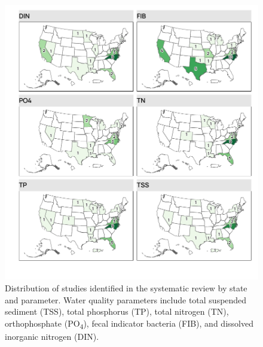 \documentclass[utf8]{FrontiersinHarvard}
\begin{document}
\begin{figure}[p]
\includegraphics[width=1\linewidth,]{frontiers_submission_revision_01_files/figure-latex/fig4} \caption{Distribution of studies identified in the systematic review by state and parameter. Water quality parameters include total suspended sediment (TSS), total phosphorus (TP), total nitrogen (TN), orthophosphate (PO\textsubscript{4}), fecal indicator bacteria (FIB), and dissolved inorganic nitrogen (DIN).}\label{fig:fig4}
\end{figure}
\end{document}
